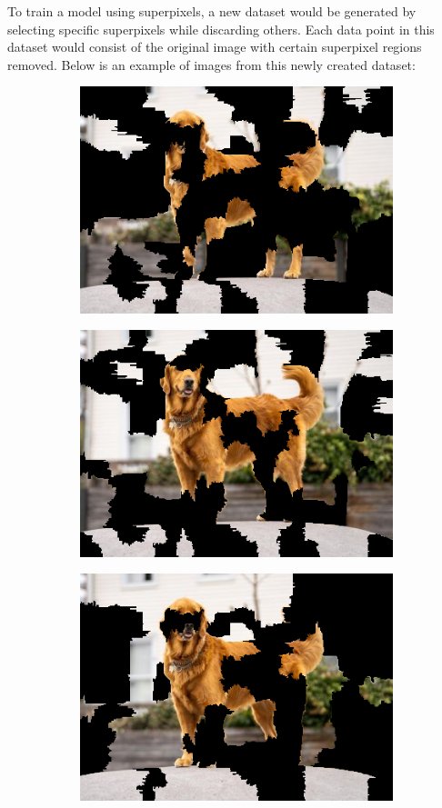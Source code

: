 To train a model using superpixels, a new dataset would be generated by selecting specific superpixels while discarding others. 
Each data point in this dataset would consist of the original image with certain superpixel regions removed. 
Below is an example of images from this newly created dataset:

\begin{figure}
    \captionsetup{justification=centering}

    \begin{subfigure}[t]{0.31\textwidth}
        \captionsetup{justification=centering}
        \centering
        \includegraphics[width=.7\linewidth]{figuras/lime/superpixel_sample0.png}
    \end{subfigure}
    \hfill
    \begin{subfigure}[t]{0.31\textwidth}
        \captionsetup{justification=centering}
        \centering
        \includegraphics[width=.7\linewidth]{figuras/lime/superpixel_sample1.png}
    \end{subfigure}
    \hfill
    \begin{subfigure}[t]{0.31\textwidth}
        \captionsetup{justification=centering}
        \centering
        \includegraphics[width=.7\linewidth]{figuras/lime/superpixel_sample2.png}

\end{subfigure}
\end{figure}
